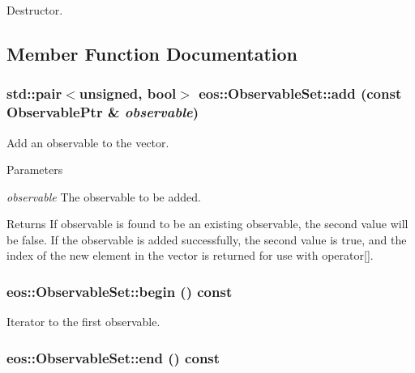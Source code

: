 Destructor. 

\subsection{Member Function Documentation}
\hypertarget{classeos_1_1ObservableSet_aca5c09236edf4270851d09bf5c582ad6}{
\subsubsection[{add}]{\setlength{\rightskip}{0pt plus 5cm}std::pair$<$unsigned, bool$>$ eos::ObservableSet::add (const {\bf ObservablePtr} \& {\em observable})}}
\label{classeos_1_1ObservableSet_aca5c09236edf4270851d09bf5c582ad6}
Add an observable to the vector.


\begin{DoxyParams}{Parameters}
\item[{\em observable}]The observable to be added.\end{DoxyParams}
\begin{DoxyReturn}{Returns}
If observable is found to be an existing observable, the second value will be false. If the observable is added successfully, the second value is true, and the index of the new element in the vector is returned for use with operator\mbox{[}\mbox{]}. 
\end{DoxyReturn}
\hypertarget{classeos_1_1ObservableSet_a51791b1a8c6a1b8d3a90f8400d9e4140}{
\subsubsection[{begin}]{ eos::ObservableSet::begin () const}}
\label{classeos_1_1ObservableSet_a51791b1a8c6a1b8d3a90f8400d9e4140}


Iterator to the first observable. \hypertarget{classeos_1_1ObservableSet_ab0fb90d7278f1d8c87f7755768ffd17c}{
\subsubsection[{end}]{ eos::ObservableSet::end () const}}
\label{classeos_1_1ObservableSet_ab0fb90d7278f1d8c87f7755768ffd17c}


